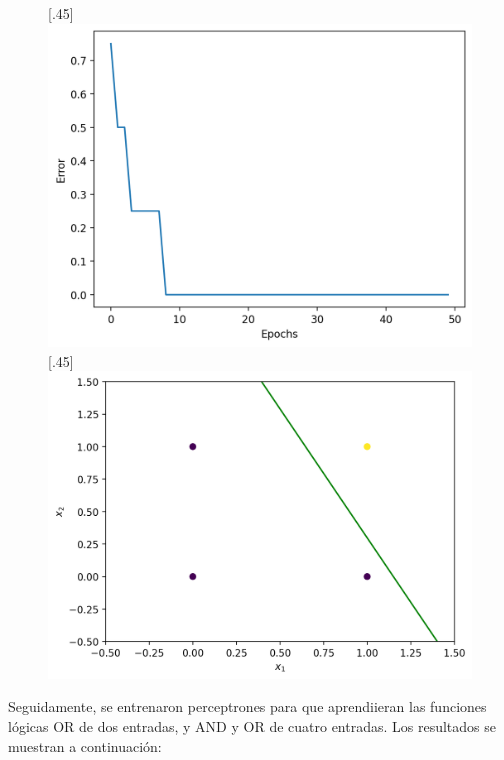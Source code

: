 \documentclass[12pt,a4paper]{article}
\begin{document}
\begin{figure}[H]
  [.45\linewidth]{
    \includegraphics[width=\linewidth]{img/1-training_error.png}
  }
  [.45\linewidth]{
    \includegraphics[width=\linewidth]{img/2-desicion_boundary.png}
  }
  \centering
\end{figure}
Seguidamente, se entrenaron perceptrones para que aprendiieran las funciones lógicas OR de dos entradas, y AND y OR de cuatro entradas. Los resultados se muestran a continuación:
\end{document}
